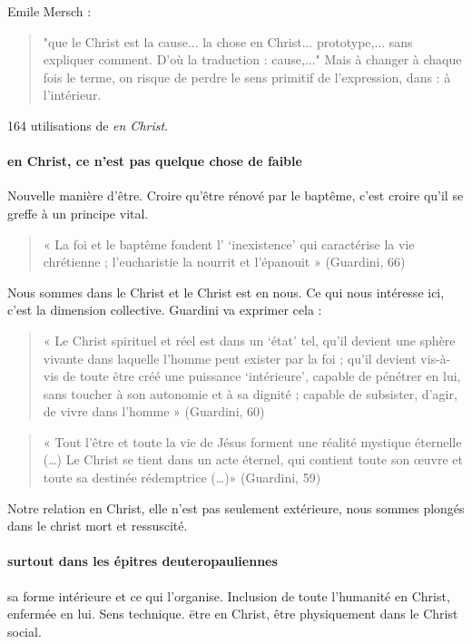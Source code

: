 Emile Mersch : 
\begin{quote}
    "que le Christ est la cause... la chose en Christ... prototype,... sans expliquer comment. D'où la traduction : cause,..."
    Mais à changer à chaque fois le terme, on risque de perdre le sens primitif de l'expression, dans : à l'intérieur. 
\end{quote}
 
 164 utilisations de \textit{en Christ}.
 
 \paragraph{en Christ, ce n'est pas quelque chose de faible}
 
  
  Nouvelle manière d'être. Croire qu'être rénové par le baptême, c'est croire qu'il se greffe à un principe vital. \begin{quote}
      « La foi et le baptême fondent l’ ‘inexistence’ qui caractérise la vie chrétienne ; l’eucharistie la nourrit et l’épanouit » (Guardini, 66)
 \end{quote}
  
  Nous sommes dans le Christ et le Christ est en nous. Ce qui nous intéresse ici, c'est la dimension collective.  Guardini va exprimer cela : 
  \begin{quote}
     « Le Christ spirituel et réel est dans un ‘état’ tel, qu’il devient une sphère vivante dans laquelle l’homme peut exister par la foi ; qu’il devient vis-à-vis de toute être créé une puissance ‘intérieure’, capable de pénétrer en lui, sans toucher à son autonomie et à sa dignité ; capable de subsister, d’agir, de vivre dans l’homme » (Guardini, 60)
 \end{quote} 
 
 
 \begin{quote}
     « Tout l’être et toute la vie de Jésus forment une réalité mystique éternelle (…) Le Christ se tient dans un acte éternel, qui contient toute son œuvre et toute sa destinée rédemptrice (…)» (Guardini, 59)
 \end{quote}
 Notre relation en Christ, elle n'est pas seulement extérieure, nous sommes plongés dans le christ mort et ressuscité.
 
 \paragraph{surtout dans les épitres deuteropauliennes} sa forme intérieure et ce qui l'organise. Inclusion de toute l'humanité en Christ, enfermée en lui. Sens technique. ëtre en Christ, être physiquement dans le Christ social. 
 
